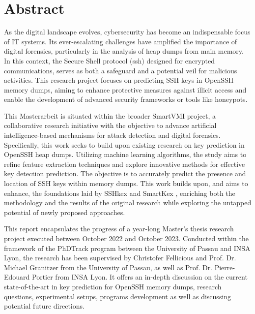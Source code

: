 \documentclass[11pt]{book} %
\title{\thetitle}
\author{\theauthor}
\date{April-Mai 2023}
\begin{document}

\newpage


\section*{Abstract}
As the digital landscape evolves, cybersecurity has become an indispensable focus of IT systems. Its ever-escalating challenges have amplified the importance of digital forensics, particularly in the analysis of heap dumps from main memory. In this context, the Secure Shell protocol (\acrshort{ssh}) designed for encrypted communications, serves as both a safeguard and a potential veil for malicious activities. This research project focuses on predicting SSH keys in OpenSSH memory dumps, aiming to enhance protective measures against illicit access and enable the development of advanced security frameworks or tools like honeypots. 

This Masterarbeit is situated within the broader SmartVMI project, a collaborative research initiative with the objective to advance artificial intelligence-based mechanisms for attack detection and digital forensics. Specifically, this work seeks to build upon existing research on key prediction in OpenSSH heap dumps. Utilizing machine learning algorithms, the study aims to refine feature extraction techniques and explore innovative methods for effective key detection prediction. The objective is to accurately predict the presence and location of SSH keys within memory dumps. This work builds upon, and aims to enhance, the foundations laid by SSHkex \cite{SSHkex22} and SmartKex \cite{SmartKex22}, enriching both the methodology and the results of the original research while exploring the untapped potential of newly proposed approaches.

This report encapsulates the progress of a year-long Master's thesis research project executed between October 2022 and October 2023. Conducted within the framework of the PhDTrack program between the University of Passau and INSA Lyon, the research has been supervised by Christofer Fellicious and Prof. Dr. Michael Granitzer from the University of Passau, as well as Prof. Dr. Pierre-Edouard Portier from INSA Lyon. It offers an in-depth discussion on the current state-of-the-art in key prediction for OpenSSH memory dumps, research questions, experimental setups, programs development as well as discussing potential future directions.
\end{document}
